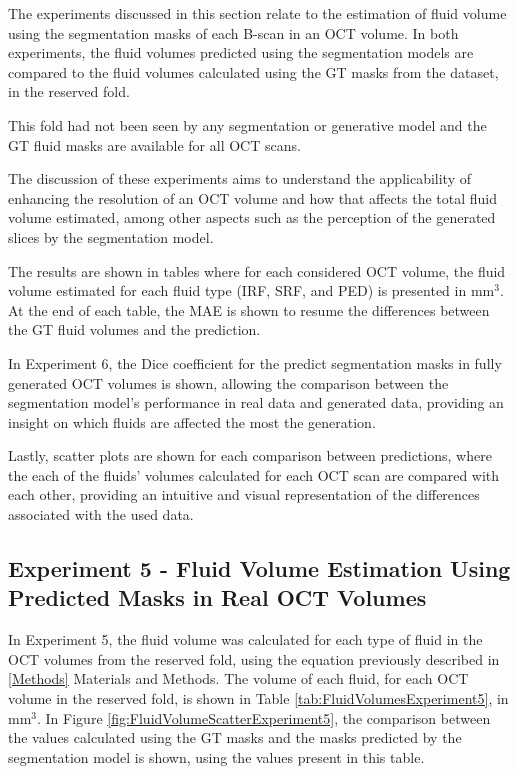The experiments discussed in this section relate to the estimation of fluid volume using the segmentation masks of each B-scan in an OCT volume. In both experiments, the fluid volumes predicted using the segmentation models are compared to the fluid volumes calculated using the GT masks from the dataset, in the reserved fold. 
\par
This fold had not been seen by any segmentation or generative model and the GT fluid masks are available for all OCT scans.
\par
The discussion of these experiments aims to understand the applicability of enhancing the resolution of an OCT volume and how that affects the total fluid volume estimated, among other aspects such as the perception of the generated slices by the segmentation model.
\par
The results are shown in tables where for each considered OCT volume, the fluid volume estimated for each fluid type (IRF, SRF, and PED) is presented in mm$^{3}$. At the end of each table, the MAE is shown to resume the differences between the GT fluid volumes and the prediction.
\par
In Experiment 6, the Dice coefficient for the predict segmentation masks in fully generated OCT volumes is shown, allowing the comparison between the segmentation model's performance in real data and generated data, providing an insight on which fluids are affected the most the generation.
\par
Lastly, scatter plots are shown for each comparison between predictions, where the each of the fluids' volumes calculated for each OCT scan are compared with each other, providing an intuitive and visual representation of the differences associated with the used data.

\subsection{Experiment 5 - Fluid Volume Estimation Using Predicted Masks in Real OCT Volumes}
In Experiment 5, the fluid volume was calculated for each type of fluid in the OCT volumes from the reserved fold, using the equation previously described in \ref{Methods} Materials and Methods. The volume of each fluid, for each OCT volume in the reserved fold, is shown in Table \ref{tab:FluidVolumesExperiment5}, in mm$^{3}$. In Figure \ref{fig:FluidVolumeScatterExperiment5}, the comparison between the values calculated using the GT masks and the masks predicted by the segmentation model is shown, using the values present in this table.

